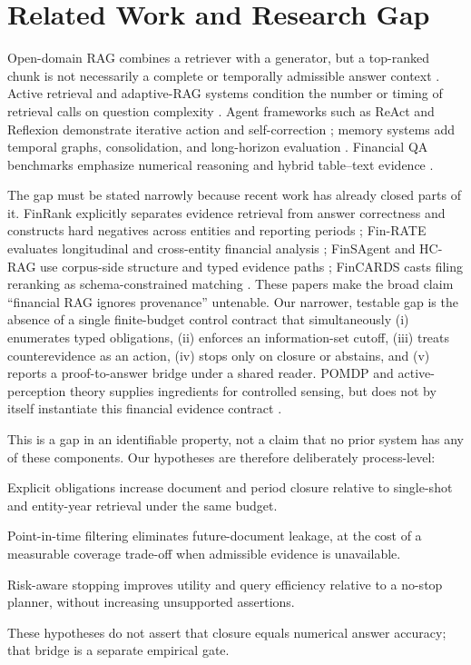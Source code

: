 \documentclass[12pt]{article}
\begin{document}
\section{Related Work and Research Gap}
Open-domain RAG combines a retriever with a generator, but a top-ranked chunk is not necessarily a complete or temporally admissible answer context \citep{lewis2020rag,mallen2023parametric}. Active retrieval and adaptive-RAG systems condition the number or timing of retrieval calls on question complexity \citep{jiang2023flare,jeong2024adaptiverag}. Agent frameworks such as ReAct and Reflexion demonstrate iterative action and self-correction \citep{yao2023react,shinn2023reflexion}; memory systems add temporal graphs, consolidation, and long-horizon evaluation \citep{packer2023memgpt,rasmussen2025zep,maharana2024locomo,wu2024longmemeval}. Financial QA benchmarks emphasize numerical reasoning and hybrid table--text evidence \citep{chen2021finqa,zhu2021tatqa,islam2023financebench}.

The gap must be stated narrowly because recent work has already closed parts of it. FinRank explicitly separates evidence retrieval from answer correctness and constructs hard negatives across entities and reporting periods \citep{mansouri2026finrank}; Fin-RATE evaluates longitudinal and cross-entity financial analysis \citep{jiang2026finrate}; FinSAgent and HC-RAG use corpus-side structure and typed evidence paths \citep{chi2026finsagent,chen2026hcrag}; FinCARDS casts filing reranking as schema-constrained matching \citep{chen2026fincards}. These papers make the broad claim ``financial RAG ignores provenance'' untenable. Our narrower, testable gap is the absence of a single finite-budget control contract that simultaneously (i) enumerates typed obligations, (ii) enforces an information-set cutoff, (iii) treats counterevidence as an action, (iv) stops only on closure or abstains, and (v) reports a proof-to-answer bridge under a shared reader. POMDP and active-perception theory supplies ingredients for controlled sensing, but does not by itself instantiate this financial evidence contract \citep{krishnamurthy2017pomdp,shi2025active,satsangi2018active}.

This is a gap in an identifiable property, not a claim that no prior system has any of these components. Our hypotheses are therefore deliberately process-level:
\begin{description}[leftmargin=*]
\item[H1 (representation).] Explicit obligations increase document and period closure relative to single-shot and entity-year retrieval under the same budget.
\item[H2 (safety).] Point-in-time filtering eliminates future-document leakage, at the cost of a measurable coverage trade-off when admissible evidence is unavailable.
\item[H3 (efficiency).] Risk-aware stopping improves utility and query efficiency relative to a no-stop planner, without increasing unsupported assertions.
\end{description}
These hypotheses do not assert that closure equals numerical answer accuracy; that bridge is a separate empirical gate.
\end{document}
